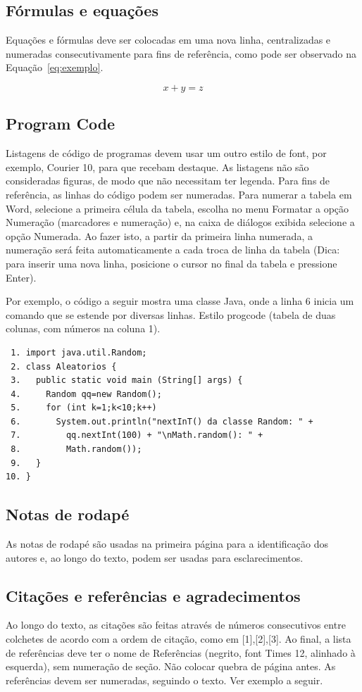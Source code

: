 \documentclass{RITA}
\begin{document}
\subsection{Fórmulas e equações}
Equações e fórmulas deve ser colocadas em uma nova linha,
centralizadas e numeradas consecutivamente para fins de referência,
como pode ser observado na Equação~\ref{eq:exemplo}.

\begin{equation}
x + y = z
\label{eq:exemplo}
\end{equation}

\subsection{Program Code}
Listagens de código de programas devem usar um outro estilo de font, por exemplo, Courier 10, para que recebam destaque.  As listagens não são consideradas figuras, de modo que não necessitam ter legenda. Para fins de referência, as linhas do código podem  ser numeradas. Para numerar a tabela em Word, selecione a primeira célula da tabela, escolha no menu Formatar a opção Numeração (marcadores e numeração) e, na caixa de diálogos exibida selecione a opção Numerada. Ao fazer isto, a partir da primeira linha numerada, a numeração será feita automaticamente a cada troca de linha da tabela (Dica: para inserir uma nova linha, posicione o cursor no final da tabela e pressione Enter).

Por exemplo, o código a seguir mostra uma classe Java, onde a linha 6 inicia um comando que se estende por diversas linhas. Estilo progcode (tabela de duas colunas, com números na coluna 1).

\begin{verbatim}
 1. import java.util.Random;
 2. class Aleatorios {
 3.   public static void main (String[] args) {
 4.     Random qq=new Random();
 5.     for (int k=1;k<10;k++)
 6.       System.out.println("nextInT() da classe Random: " +
 7.         qq.nextInt(100) + "\nMath.random(): " +
 8.         Math.random());
 9.   }
10. }
\end{verbatim}

\subsection{Notas de rodapé}
As notas de rodapé são usadas na primeira página para a identificação dos autores e, ao longo do texto, podem ser usadas para esclarecimentos. 

\subsection{Citações e referências e agradecimentos}
Ao longo do texto, as citações são feitas através de números consecutivos entre colchetes de acordo com a ordem de citação, como em [1],[2],[3]. Ao final, a lista de referências deve ter o nome de Referências (negrito, font Times 12, alinhado à esquerda), sem numeração de seção. Não colocar quebra de página antes. As referências devem ser numeradas, seguindo o texto. Ver exemplo a seguir. 
\end{document}
